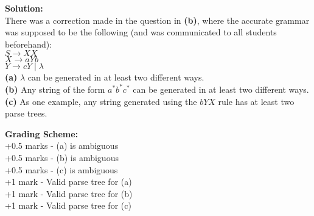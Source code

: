 \documentclass[11pt, article, oneside]{memoir}
\begin{document}
\begin{enumerate}
        \textbf{Solution:}
        \\There was a correction made in the question in \textbf{(b)}, where the accurate grammar was supposed to be the following (and was communicated to all students beforehand):
        \\\textbf{\(S \rightarrow XX \)}
        \\\textbf{\(X \rightarrow aYb\)}
        \\\textbf{\(Y \rightarrow cY \mid \lambda\)}
        \\\textbf{(a)} \(\lambda\) can be generated in at least two different ways.
        \\\textbf{(b)} Any string of the form \(a^*b^*c^*\) can be generated in at least two different ways.
        \\\textbf{(c)} As one example, any string generated using the \(bYX\) rule has at least two parse trees.
        

        \textbf{Grading Scheme:}
        \\+0.5 marks - (a) is ambiguous
        \\+0.5 marks - (b) is ambiguous
        \\+0.5 marks - (c) is ambiguous
        \\+1 mark - Valid parse tree for (a)
        \\+1 mark - Valid parse tree for (b)
        \\+1 mark - Valid parse tree for (c)
        

\end{enumerate}
\end{document}
